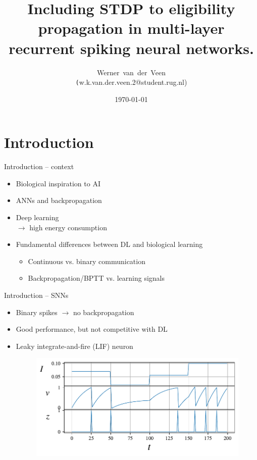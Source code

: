 \documentclass[t]{beamer}
\title[Eligibility propagation]{Including STDP to eligibility propagation in multi-layer recurrent spiking neural networks.}
\author[Werner van der Veen]{Werner~van~der~Veen\\\footnotesize\texttt({w.k.van.der.veen.2@student.rug.nl})}\date{\today}
\begin{document}
\begin{frame}
    \titlepage
\end{frame}


\small

\section{Introduction}
\begin{frame}{Introduction -- context}
    \begin{itemize}[label=--]
      \item Biological inspiration to AI
      \item ANNs and backpropagation
      \item Deep learning\\$\rightarrow$ high energy consumption
      \item Fundamental differences between DL and biological learning
      \begin{itemize}[label=--]
        \item Continuous vs. binary communication
        \item Backpropagation/BPTT vs. learning signals
      \end{itemize}
    \end{itemize}

  \end{frame}


  \begin{frame}{Introduction -- SNNs}
    \begin{itemize}[label=--]
      \item Binary spikes $\rightarrow$ no backpropagation
      \item Good performance, but not competitive with DL
      \item Leaky integrate-and-fire (LIF) neuron

    \begin{figure}[!ht]
      \centering
      \includegraphics[width=\linewidth]{simplesnn}
    \end{figure}
    \end{itemize}
  \end{frame}
\end{document}
